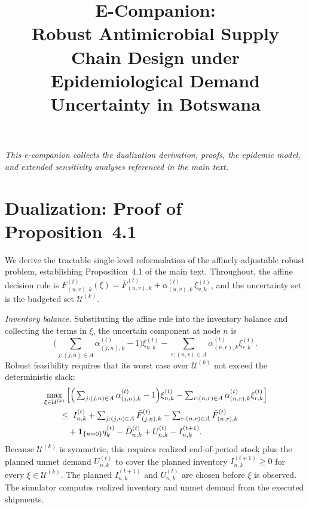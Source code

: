 \documentclass[11pt]{article}
\title{\textbf{E-Companion:\\ Robust Antimicrobial Supply Chain Design under\\ Epidemiological Demand Uncertainty in Botswana}}
\date{}
\begin{document}
\maketitle
\vspace{-3em}
\begin{center}
\textit{This e-companion collects the dualization derivation, proofs, the epidemic model, and extended sensitivity analyses referenced in the main text.}
\end{center}
\bigskip

\section{Dualization: Proof of Proposition~4.1}
\label{ec:dualization}

We derive the tractable single-level reformulation of the affinely-adjustable robust problem, establishing Proposition~4.1 of the main text.
Throughout, the affine decision rule is $F_{(u,v),k}^{(t)}(\xi) = \bar F_{(u,v),k}^{(t)} + \alpha_{(u,v),k}^{(t)}\,\xi_{v,k}^{(t)}$, and the uncertainty set is the budgeted set $\mathcal{U}^{(k)}$.

\emph{Inventory balance.}
Substituting the affine rule into the inventory balance and collecting the terms in $\xi$, the uncertain component at node $n$ is
\begin{equation}
\Big(\textstyle\sum_{j:(j,n)\in A}\alpha_{(j,n),k}^{(t)} - 1\Big)\xi_{n,k}^{(t)}
- \sum_{r:(n,r)\in A}\alpha_{(n,r),k}^{(t)}\xi_{r,k}^{(t)}.
\end{equation}
Robust feasibility requires that its worst case over $\mathcal{U}^{(k)}$ not exceed the deterministic slack:
\begin{align}
&\max_{\xi\in\mathcal{U}^{(k)}}\Big[\Big(\textstyle\sum_{j:(j,n)\in A}\alpha_{(j,n),k}^{(t)} - 1\Big)\xi_{n,k}^{(t)}
- \sum_{r:(n,r)\in A}\alpha_{(n,r),k}^{(t)}\xi_{r,k}^{(t)}\Big] \notag\\
&\qquad \le\; I_{n,k}^{(t)}
+ \textstyle\sum_{j:(j,n)\in A}\bar F_{(j,n),k}^{(t)}
- \textstyle\sum_{r:(n,r)\in A}\bar F_{(n,r),k}^{(t)} \notag\\
&\qquad\quad + \mathbf{1}_{\{n=0\}}q_k^{(t)}
- \bar D_{n,k}^{(t)} + U_{n,k}^{(t)} - I_{n,k}^{(t+1)}.
\label{eq:ec-inv-robust}
\end{align}
Because $\mathcal{U}^{(k)}$ is symmetric, this requires realized end-of-period stock plus the planned unmet demand $U_{n,k}^{(t)}$ to cover the planned inventory $I_{n,k}^{(t+1)} \ge 0$ for every $\xi \in \mathcal{U}^{(k)}$.
The planned $I_{n,k}^{(t+1)}$ and $U_{n,k}^{(t)}$ are chosen before $\xi$ is observed.
The simulator computes realized inventory and unmet demand from the executed shipments.
\end{document}
